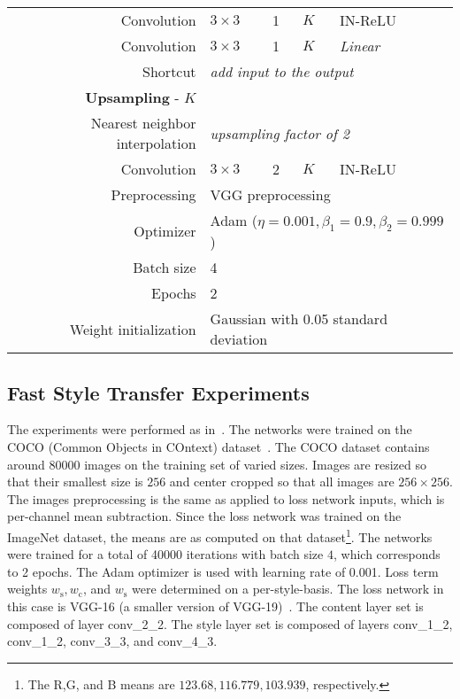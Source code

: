 \begin{table}
\begin{adjustbox}{max width=\textwidth}
\begin{tabular}{rlllll}
			Convolution & $3\times 3$ & 1 & $K$ & IN-ReLU & \\
			Convolution & $3\times 3$ & 1 & $K$ & \textit{Linear} & \\
			Shortcut & \multicolumn{5}{l}{\textit{add input to the output}}\\
			\textbf{Upsampling} - $K$ & & & & &\\
			Nearest neighbor interpolation & \multicolumn{5}{l}{\textit{upsampling factor of 2}}\\
			Convolution & $3\times 3$ & 2 & $K$ & IN-ReLU & \\			
			\hline
			Preprocessing & \multicolumn{5}{l}{VGG preprocessing}\\
			Optimizer                                        & \multicolumn{5}{l}{Adam ($\eta = 0.001, \beta_1=0.9, \beta_2=0.999$)}        \\
			Batch size                                       & \multicolumn{5}{l}{4}                                      \\
			Epochs                                           & \multicolumn{5}{l}{2}                                       \\
			Weight initialization                            & \multicolumn{5}{l}{Gaussian with 0.05 standard deviation}            
		\end{tabular}
	\end{adjustbox}
\end{table}

\subsection{Fast Style Transfer Experiments}\label{sec:single-style-exp}
The experiments were performed as in~\cite{johnson2016perceptual}. The networks were trained on the COCO (Common Objects in COntext) dataset~\cite{lin2014microsoft}. The COCO dataset contains around 80000 images on the training set of varied sizes. Images are resized so that their smallest size is $256$ and center cropped so that all images are $256\times 256$. The images preprocessing is the same as applied to loss network inputs, which is per-channel mean subtraction. Since the loss network was trained on the ImageNet dataset, the means are as computed on that dataset\footnote{The R,G, and B means are $123.68, 116.779, 103.939$, respectively.}. The networks were trained for a total of 40000 iterations with batch size $4$, which corresponds to 2 epochs. The Adam optimizer is used with learning rate of 0.001. Loss term weights $w_\text{s}, w_\text{c}$, and $w_\text{s}$ were determined on a per-style-basis. The loss network in this case is VGG-16 (a smaller version of VGG-19)~\cite{simonyan2014very}. The content layer set is composed of layer conv\_2\_2. The style layer set is composed of layers conv\_1\_2, conv\_1\_2, conv\_3\_3, and conv\_4\_3.

